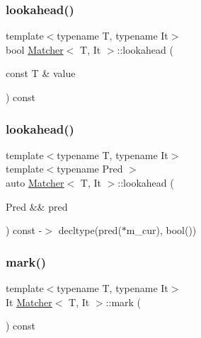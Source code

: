 \mbox{\label{class_matcher_ab2141c8f5c1d61b41f9d9f70f88e6697}} 
\subsubsection{\texorpdfstring{lookahead()}{lookahead()}\hspace{0.1cm}{\footnotesize\ttfamily [1/2]}}
{\footnotesize\ttfamily template$<$typename T, typename It$>$ \\
bool \hyperlink{class_matcher}{Matcher}$<$ T, It $>$\+::lookahead (\begin{DoxyParamCaption}\item[{const T \&}]{value }\end{DoxyParamCaption}) const\hspace{0.3cm}{\ttfamily [inline]}}

\mbox{\label{class_matcher_a9e9a6c37a2de57596fa66dae29fe7b51}} 
\subsubsection{\texorpdfstring{lookahead()}{lookahead()}\hspace{0.1cm}{\footnotesize\ttfamily [2/2]}}
{\footnotesize\ttfamily template$<$typename T, typename It$>$ \\
template$<$typename Pred $>$ \\
auto \hyperlink{class_matcher}{Matcher}$<$ T, It $>$\+::lookahead (\begin{DoxyParamCaption}\item[{Pred \&\&}]{pred }\end{DoxyParamCaption}) const -\/$>$ decltype(pred($\ast$m\+\_\+cur), bool())
  \hspace{0.3cm}{\ttfamily [inline]}}

\mbox{\label{class_matcher_af9135752ac195a21c230267d52db6623}} 
\subsubsection{\texorpdfstring{mark()}{mark()}}
{\footnotesize\ttfamily template$<$typename T, typename It$>$ \\
It \hyperlink{class_matcher}{Matcher}$<$ T, It $>$\+::mark (\begin{DoxyParamCaption}{ }\end{DoxyParamCaption}) const\hspace{0.3cm}{\ttfamily [inline]}}

